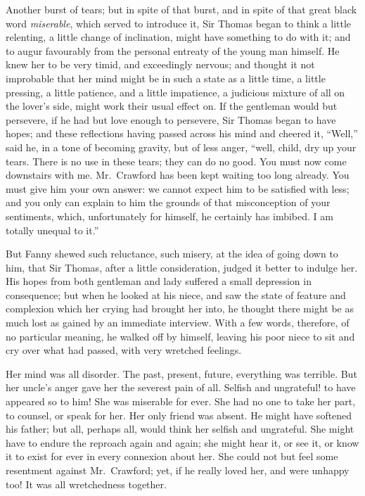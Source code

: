 \documentclass{article}
\begin{document}
Another burst of tears; but in spite of that burst,
and in spite of that great black word \emph{miserable},
which served to introduce it, Sir Thomas began to think
a little relenting, a little change of inclination,
might have something to do with it; and to augur favourably
from the personal entreaty of the young man himself.
He knew her to be very timid, and exceedingly nervous;
and thought it not improbable that her mind might be
in such a state as a little time, a little pressing,
a little patience, and a little impatience, a judicious
mixture of all on the lover's side, might work their
usual effect on.  If the gentleman would but persevere,
if he had but love enough to persevere, Sir Thomas began
to have hopes; and these reflections having passed across
his mind and cheered it, ``Well,'' said he, in a tone
of becoming gravity, but of less anger, ``well, child,
dry up your tears.  There is no use in these tears;
they can do no good.  You must now come downstairs with me.
Mr.\ Crawford has been kept waiting too long already.
You must give him your own answer:  we cannot expect him
to be satisfied with less; and you only can explain to him
the grounds of that misconception of your sentiments, which,
unfortunately for himself, he certainly has imbibed.  I am
totally unequal to it.''

But Fanny shewed such reluctance, such misery, at the
idea of going down to him, that Sir Thomas, after a
little consideration, judged it better to indulge her.
His hopes from both gentleman and lady suffered a small
depression in consequence; but when he looked at his niece,
and saw the state of feature and complexion which her
crying had brought her into, he thought there might
be as much lost as gained by an immediate interview.
With a few words, therefore, of no particular meaning,
he walked off by himself, leaving his poor niece to sit
and cry over what had passed, with very wretched feelings.

Her mind was all disorder.  The past, present, future,
everything was terrible.  But her uncle's anger gave
her the severest pain of all.  Selfish and ungrateful!
to have appeared so to him!  She was miserable for ever.
She had no one to take her part, to counsel, or speak
for her.  Her only friend was absent.  He might have
softened his father; but all, perhaps all, would think
her selfish and ungrateful.  She might have to endure
the reproach again and again; she might hear it, or see it,
or know it to exist for ever in every connexion about her.
She could not but feel some resentment against Mr.\ Crawford;
yet, if he really loved her, and were unhappy too!
It was all wretchedness together.
\end{document}
